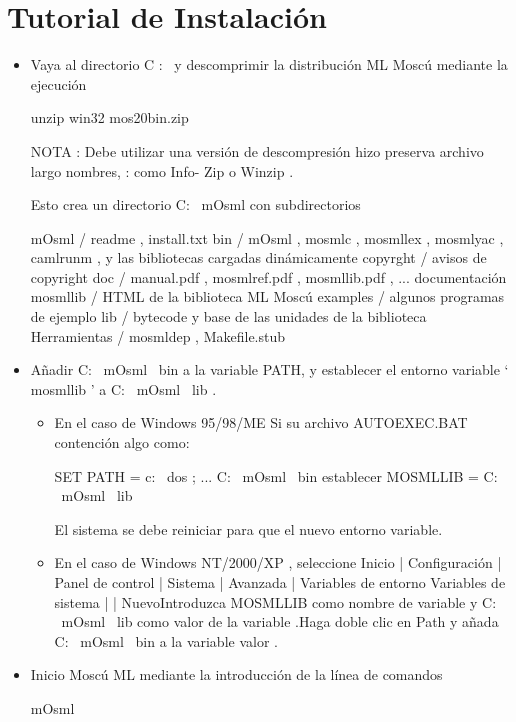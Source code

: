 \documentclass[11pt]{article} %
\begin{document}
\section{\color{red}Tutorial de Instalación}

\begin{itemize}
\item Vaya al directorio C : \ y descomprimir la distribución ML Moscú
mediante la ejecución

unzip win32 mos20bin.zip

NOTA : Debe utilizar una versión de descompresión hizo preserva archivo largo
nombres, : como Info- Zip o Winzip .

Esto crea un directorio C: \ mOsml con subdirectorios

mOsml / readme , install.txt
bin / mOsml , mosmlc , mosmllex , mosmlyac , camlrunm ,
y las bibliotecas cargadas dinámicamente
copyrght / avisos de copyright
doc / manual.pdf , mosmlref.pdf , mosmllib.pdf , ...
documentación mosmllib / HTML de la biblioteca ML Moscú
examples / algunos programas de ejemplo
lib / bytecode y base de las unidades de la biblioteca
Herramientas / mosmldep , Makefile.stub

\item Añadir C: \ mOsml \ bin a la variable PATH, y establecer el entorno
     variable ` mosmllib ' a C: \ mOsml \ lib .

\begin{itemize}
\item En el caso de Windows 95/98/ME Si su archivo AUTOEXEC.BAT contención algo como:

SET PATH = c: \ dos ; ... C: \ mOsml \ bin
establecer MOSMLLIB = C: \ mOsml \ lib

El sistema se debe reiniciar para que el nuevo entorno variable.

\item En el caso de Windows NT/2000/XP , seleccione Inicio | Configuración | Panel de control | Sistema | Avanzada | Variables de entorno Variables de sistema | | NuevoIntroduzca MOSMLLIB como nombre de variable y C: \ mOsml \ lib como valor de la variable .Haga doble clic en Path y añada C: \ mOsml \ bin a la variable valor .

\end{itemize}

\item Inicio Moscú ML mediante la introducción de la línea de comandos

        mOsml

\end{itemize}
\end{document}
